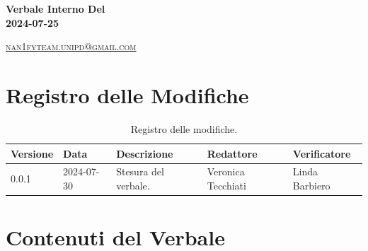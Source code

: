 \documentclass[8pt]{article}
\begin{document}
\begin{titlepage}
\begin{minipage}[t]{0.47\textwidth}
{		}
		\vspace{4mm}\vspace{4mm}
	\end{minipage}
	\vspace{4cm}
	\begin{center}
		\begin{flushright}
			{\fontsize{30pt}{52pt}\selectfont \textbf{Verbale Interno Del\\2024-07-25\\}} %
		\end{flushright}
		\vspace{3cm}
	\end{center}
	\vspace{8.5 cm}
	{\small \textsc{\href{mailto: nan1fyteam.unipd@gmail.com}{nan1fyteam.unipd@gmail.com}}}
\end{titlepage}
\pagestyle{mystyle}
\section*{Registro delle Modifiche}
\begin{table}[ht!]	
	\centering
	\begin{tabular}{p{1.2cm} p{2cm} p{5cm} p{3cm} p{3cm}}
		\toprule
		\textbf{Versione}& \textbf{Data} & \textbf{Descrizione} & \textbf{Redattore} & \textbf{Verificatore} \\
		\midrule
			0.0.1 & 2024-07-30 & Stesura del verbale. & Veronica Tecchiati & Linda Barbiero
 			\\ %

		\bottomrule
	\end{tabular}
	\caption{Registro delle modifiche.}
	\label{table:Registro delle modifiche}
\end{table}
\newpage
\tableofcontents
\clearpage
\newpage
\justifying
\section{Contenuti del Verbale}
\end{document}
